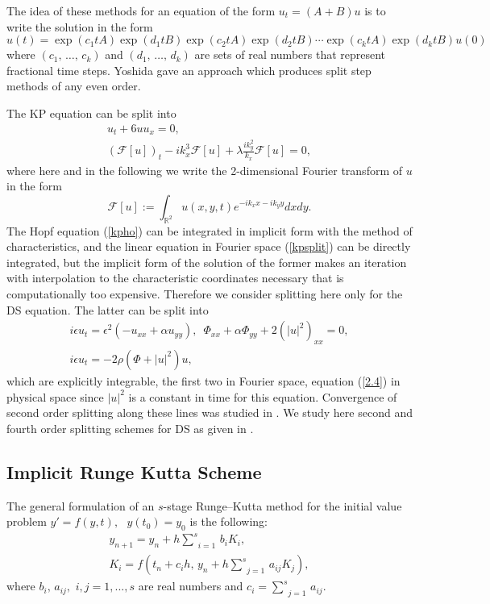 \documentclass[final]{siamltex}
\begin{document}
The idea of these methods for an equation of the form $u_{t}=\left(A+B\right)u$ is to write the solution in the
form
\[
u(t)=\exp(c_{1}tA)\exp(d_{1}tB)\exp(c_{2}tA)\exp(d_{2}tB)\cdots\exp(c_{k}tA)\exp(d_{k}tB)u(0)
\]
where $(c_{1},\,\ldots,\, c_{k})$ and $(d_{1},\,\ldots,\, d_{k})$
are sets of real numbers that represent fractional time steps.  
Yoshida \cite{Y} gave an approach 
which produces split step methods of any even order.

The KP equation can be split into
\begin{eqnarray}
u_{t}+6uu_{x}=0,  \label{kpho}
\\
(\mathcal{F}[u])_{t}-ik_{x}^{3}\mathcal{F}[u]+\lambda 
\frac{ik_{y}^{2}}{k_{x}}\mathcal{F}[u]=0, 
\label{kpsplit}              
\end{eqnarray}
where 
here and in the following we write the 2-dimensional Fourier 
transform of $u$ in the form
\begin{equation}
    \mathcal{F}[u]:=\int_{\mathbb{R}^{2}}^{}u(x,y,t)e^{-ik_{x}x-ik_{y}y}dxdy.
    \label{fourier2d}
\end{equation}
The Hopf equation (\ref{kpho}) can be integrated in implicit form with the method of 
characteristics, and the linear equation in Fourier space (\ref{kpsplit})
can be directly integrated, but the implicit form of the solution of the 
former makes an iteration with interpolation to the characteristic 
coordinates necessary that is computationally too 
expensive. Therefore we consider splitting here only for the DS 
equation. The latter can be split into
\begin{eqnarray}
i\epsilon u_{t}=\epsilon^{2}(-u_{xx}+\alpha u_{yy}),\,\,\, 
\Phi_{xx}+\alpha\Phi_{yy}+2\left(\left|u\right|^{2}\right)_{xx}=0 ,
\\
i\epsilon u_{t}= -2\rho\left(\Phi+\left|u\right|^{2}\right)u,  
\label{2.4}              
\end{eqnarray}
which are explicitly integrable, the first two in Fourier space, 
equation (\ref{2.4}) in physical space since 
$|u|^{2}$ is a constant in time for this equation. Convergence of second order 
splitting along these lines was studied in \cite{BMS}. We study here 
second and fourth order splitting schemes for DS as given in \cite{Y}. 

\subsection{Implicit Runge Kutta Scheme}

The general formulation of an $s$-stage Runge--Kutta method for the initial value problem
$y'=f(y,t),\,\,\,\,y(t_0)=y_0$ is the following:
\begin{eqnarray}
 y_{n+1} = y_{n} + h      \underset{i=1}{\overset{s}{\sum}} \, 
 b_{i}K_{i}, \\
 K_{i} = f\left(t_{n}+c_ {i}h,\,y_{n}+h  
 \underset{j=1}{\overset{s}{\sum}} \, a_{ij}K_{j}\right),
\end{eqnarray}
where $b_i,\,a_{ij},\,\,i,j=1,...,s$ are real numbers and
$c_i=   \underset{j=1}{\overset{s}{\sum}} \, a_{ij}$.  
\end{document}
